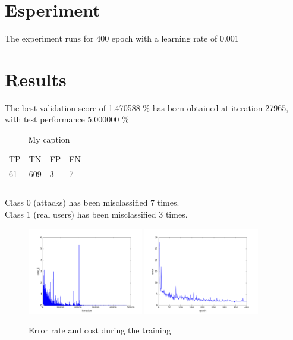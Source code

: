 \documentclass[a4paper]{article}
\begin{document}
\section{Esperiment}
The experiment runs for 400 epoch with a learning rate of 0.001

\section{Results}
The best validation score of 1.470588 \% has been obtained at iteration 27965, with test performance 5.000000 \%

\begin{table}[]
\centering
\caption{My caption}
\label{my-label}
\begin{tabular}{lllll}
TP & TN  & FP & FN &  \\
61 & 609 & 3  & 7  &  \\
   &     &    &    &  \\
   &     &    &    & 
\end{tabular}
\end{table}

Class 0 (attacks) has been misclassified 7 times.\\
Class 1 (real users) has been misclassified 3 times.\\

\begin{figure}[htb]
\centering
\includegraphics[width=0.45\textwidth]{images/cost_frav.png}
\includegraphics[width=0.45\textwidth]{images/error_frav.png}
\caption{Error rate and cost during the training} \label{fig:ErrorCost}
\end{figure}
\end{document}
